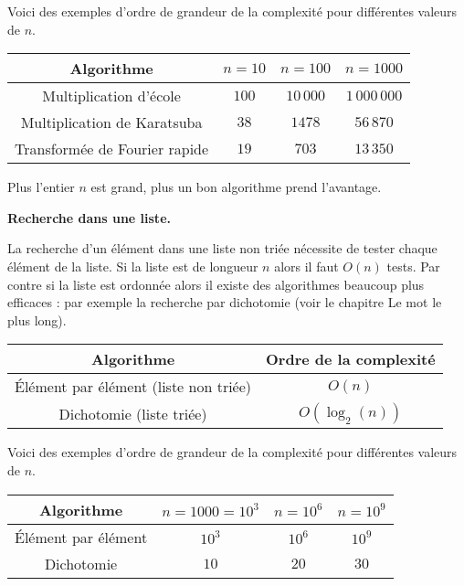 \documentclass[11pt,class=report,crop=false]{standalone}
\begin{document}
\begin{cours}
Voici des exemples d'ordre de grandeur de la complexité pour différentes valeurs de $n$.
\begin{center}
	\begin{tabular}{|c|c|c|c|}\hline
		Algorithme  & $n=10$ & $n=100$ & $n=1000$  \\ \hline\hline
		Multiplication d'école & $100$ & $10\,000$ & $1\,000\,000$ \\ \hline
		Multiplication de Karatsuba & $38$ & $1478$ &  $56\,870$ \\ \hline
		Transformée de Fourier rapide & $19$ & $703$ & $13\,350$   \\\hline
	\end{tabular}
\end{center} 

Plus l'entier $n$ est grand, plus un bon algorithme prend l'avantage.

\bigskip

\textbf{Recherche dans une liste.}

La recherche d'un élément dans une liste non triée nécessite de tester chaque élément de la liste.
Si la liste est de longueur $n$ alors il faut $O(n)$ tests.
Par contre si la liste est ordonnée alors il existe des algorithmes beaucoup plus efficaces : par exemple la recherche par dichotomie (voir le chapitre \og{}Le mot le plus long\fg{}).


\begin{center}
	\begin{tabular}{|c|c|}\hline
		Algorithme  & Ordre de la complexité \\ \hline\hline
		\'Elément par élément (liste non triée) & $O(n)$ \\ \hline
		Dichotomie (liste triée) & $O(\log_2(n))$  \\ \hline
	\end{tabular}
\end{center}

Voici des exemples d'ordre de grandeur de la complexité pour différentes valeurs de $n$.
\begin{center}
	\begin{tabular}{|c|c|c|c|}\hline
		Algorithme  & $n=1000 =10^3$ & $n=10^6$ & $n=10^9$  \\ \hline\hline
		\'Elément par élément & $10^3$ & $10^6$ & $10^9$ \\ \hline
		Dichotomie & $10$ & $20$ &  $30$ \\ \hline
	\end{tabular}
\end{center} 


\end{cours}
\end{document}
